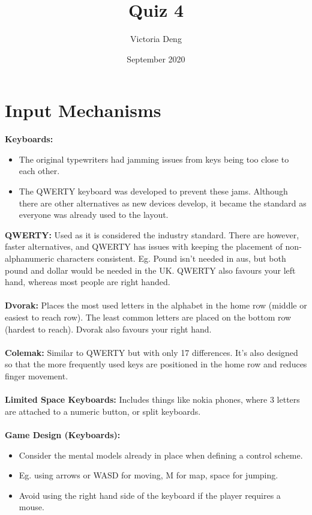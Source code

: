 \documentclass[a4paper,10pt]{article}
\title{Quiz 4}
\author {Victoria Deng}
\date{\small September 2020}
\begin{document}
\maketitle 
\section*{Input Mechanisms}
\textcolor{Cerulean}{\textbf{Keyboards:}}
\renewcommand{\labelitemi}{\textperiodcentered}
\begin{itemize}
\item The original typewriters had jamming issues from keys being too close to each other. 
\item The QWERTY keyboard was developed to prevent these jams. Although there are other alternatives as new devices develop, it became the standard as everyone was already used to the layout. 
\end{itemize}
\textcolor{Cerulean}{\textbf{QWERTY:}} Used as it is considered the industry standard. There are however, faster alternatives, and QWERTY has issues with keeping the placement of non-alphanumeric characters consistent. Eg. Pound isn't needed in aus, but both pound and dollar would be needed in the UK. QWERTY also favours your left hand, whereas most people are right handed.\\\\
\textcolor{Cerulean}{\textbf{Dvorak:}} Places the most used letters in the alphabet in the home row (middle or easiest to reach row). The least common letters are placed on the bottom row (hardest to reach). Dvorak also favours your right hand. \\\\
\textcolor{Cerulean}{\textbf{Colemak:}} Similar to QWERTY but with only 17 differences. It's also designed so that the more frequently used keys are positioned in the home row and reduces finger movement. \\\\
\textcolor{Cerulean}{\textbf{Limited Space Keyboards:}} Includes things like nokia phones, where 3 letters are attached to a numeric button, or split keyboards.  \\\\
\textcolor{Cerulean}{\textbf{Game Design (Keyboards):}}
\renewcommand{\labelitemi}{\textperiodcentered}
\begin{itemize}
\item Consider the mental models already in place when defining a control scheme. 
\item Eg. using arrows or WASD for moving, M for map, space for jumping.
\item Avoid using the right hand side of the keyboard if the player requires a mouse. 
\end{itemize}
\end{document}
